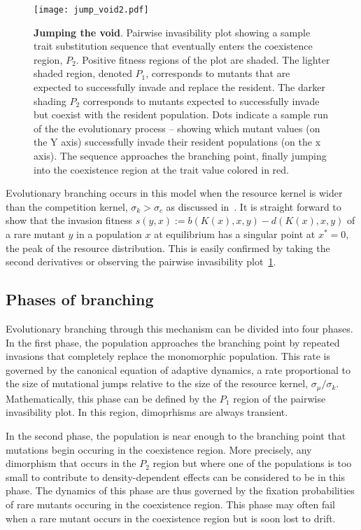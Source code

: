 \documentclass[authoryear,review,11pt]{elsarticle}
\begin{document}
\begin{figure}[h]
\begin{center}
\texttt{[image: jump\_void2.pdf]}
\end{center}
\caption{\textbf{Jumping the void}. Pairwise invasibility plot showing a sample trait substitution sequence that eventually enters the coexistence region, $P_2$.  Positive fitness regions of the plot are shaded.  The lighter shaded region, denoted $P_1$, corresponds to mutants that are expected to successfully invade and replace the resident.  The darker shading $P_2$ corresponds to mutants expected to successfully invade but coexist with the resident population.   Dots indicate a sample run of the the evolutionary process -- showing which mutant values (on the Y axis) successfully invade their resident populations (on the x axis).  The sequence approaches the branching point, finally jumping into the coexistence region at the trait value colored in red.  }
\label{fig:pip}
\end{figure}

Evolutionary branching occurs in this model when the resource kernel is wider than the competition kernel, $\sigma_k > \sigma_c$ as discussed in~\citet{geritz_evoeco1998, dieckmann_nat1999}.  It is straight forward to show that the invasion fitness $s(y,x) := b(K(x),x,y) -d(K(x), x,y)$ of a rare mutant $y$ in a population $x$ at equilibrium has a singular point at $x^*=0$, the peak of the resource distribution.  This is easily confirmed by taking the second derivatives or observing the pairwise invasibility plot~\ref{fig:pip}.  


\subsection{Phases of branching}
Evolutionary branching through this mechanism can be divided into four phases.  In the first phase, the population approaches the branching point by repeated invasions that completely replace the monomorphic population.  This rate is governed by the canonical equation of adaptive dynamics, a rate proportional to the size of mutational jumps relative to the size of the resource kernel, $\sigma_{\mu}/\sigma_k$.  Mathematically, this phase can be defined by the $P_1$ region of the pairwise invasibility plot.  In this region, dimoprhisms are always transient.  

In the second phase, the population is near enough to the branching point that mutations begin occuring in the coexistence region.  More precisely, any dimorphism that occurs in the $P_2$ region but where one of the populations is too small to contribute to density-dependent effects can be considered to be in this phase.  The dynamics of this phase are thus governed by the fixation probabilities of rare mutants occuring in the coexistence region.  This phase may often fail when a rare mutant occurs in the coexistence region but is soon lost to drift.  
\end{document}
